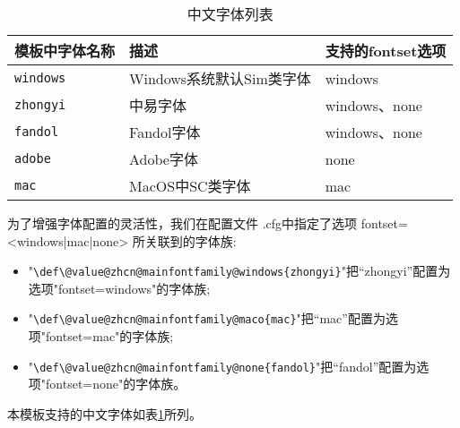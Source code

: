 \begin{table}[!htbp]
    \caption{中文字体列表}
    \label{tab:zhcnfont}
    \centering
    \small%
    \setlength{\tabcolsep}{4pt}%
    \renewcommand{\arraystretch}{1.2}%
    \begin{tabular}{lll}
        \toprule
         模板中字体名称 & 描述 &支持的fontset选项 \\
        \midrule
        \texttt{windows} & Windows系统默认Sim类字体 & windows  \\
        \texttt{zhongyi} & 中易字体 & windows、none \\
        \texttt{fandol}  & Fandol字体 & windows、none \\
        \texttt{adobe} & Adobe字体 & none \\
        \texttt{mac} & MacOS中SC类字体 & mac \\
        \bottomrule
    \end{tabular}
\end{table}

 为了增强字体配置的灵活性，我们在配置文件 \projectname .cfg中指定了选项 fontset=<windows|mac|none> 所关联到的字体族:
\begin{itemize}
\item "\texttt{\backslash def\backslash \projectname @value@zhcn@mainfontfamily@windows\{zhongyi\}}"把“zhongyi”配置为选项"fontset=windows"的字体族;
\item "\texttt{\backslash def\backslash \projectname @value@zhcn@mainfontfamily@maco\{mac\}}"把“mac”配置为选项"fontset=mac"的字体族;
\item "\texttt{\backslash def\backslash \projectname @value@zhcn@mainfontfamily@none\{fandol\}}"把“fandol”配置为选项"fontset=none"的字体族。
\end{itemize}

本模板支持的中文字体如表\ref{tab:zhcnfont}所列。




